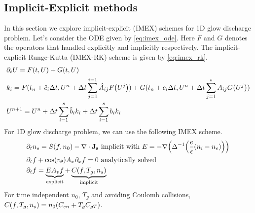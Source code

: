\documentclass{article}[draft]
\begin{document}
\subsection{Implicit-Explicit methods}
In this section we explore implicit-explicit (IMEX) schemes for 1D glow discharge problem. Let's consider the ODE given by \eqref{eq:imex_ode}. Here $F$ and $G$ denotes the operators that handled explicitly and implicitly respectively. The implicit-explicit Runge-Kutta (IMEX-RK) scheme is given by \eqref{eq:imex_rk}.
\begin{align}
	&\partial_t U = F(t, U) + G(t, U) \label{eq:imex_ode}\\
	&k_{i} = F(t_n + \hat{c}_i \Delta t, U^n + \Delta t \sum_{j=1}^{i-1} \hat{A}_{ij} F\of{U^j}) + G(t_n + c_i \Delta t, U^n + \Delta t \sum_{j=1}^{s} A_{ij} G\of{U^j}) \\%
	&U^{n+1} = U^{n} + \Delta t \sum_{i=1}^{s} \hat{b}_i k_i + \Delta t \sum_{i=1}^{s} b_i k_i \label{eq:imex_rk}
\end{align}
For 1D glow discharge problem, we can use the following IMEX scheme. 
\begin{align}
	&\partial_t n_s  = S(f,n_0) - \nabla \cdot \vect{J_s} \text{ implicit with } E = -\nabla\of{\Delta^{-1}\of{\frac{e}{\epsilon} (n_i - n_e)}} \\
	&\partial_t f    +  \cos(\vtheta) A_x \partial_x f = 0 \text{ analytically solved}\\  
	&\partial_t f    = \underbrace{E A_v f}_{\text{explicit}} + \underbrace{C(f, T_g, n_s)}_{\text{implicit}}
\end{align}
For time independent $n_0$, $T_g$ and avoiding Coulomb collisions, $C(f, T_g, n_s) = n_0 \of{C_{en} + T_g C_{gT}}$. 
\end{document}
